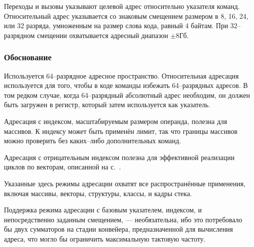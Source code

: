 \documentclass[forwardcom.tex]{subfiles}
\begin{document}
Переходы и вызовы указывают целевой адрес относительно указателя команд. Относительный адрес указывается со знаковым смещением размером в 8, 16, 24, или 32 разряда, умноженным на размер слова кода, равный 4 байтам. При 32--разрядном смещении охватывается адресный диапазон $\pm8\text{Гб}$.


\subsubsection{Обоснование}
Используется 64--разрядное адресное пространство. Относительная адресация используется для того, чтобы в коде команды избежать 64--разрядных адресов. В том редком случае, когда 64--разрядный абсолютный адрес необходим, он должен быть загружен в регистр, который затем используется как указатель.

Адресация с индексом, масштабируемым размером операнда, полезна для массивов. К индексу может быть применён лимит, так что границы массивов можно проверить без каких--либо дополнительных команд.

Адресация с отрицательным индексом полезна для эффективной реализации циклов по векторам, описанной на с.~\pageref{vectorLoops}.

Указанные здесь режимы адресации охватят все распространённые применения, включая массивы, векторы, структуры, классы, и кадры стека.

Поддержка режима адресации с базовым указателем, индексом, и непосредственно заданным смещением, --- необязательна, ибо это потребовало бы двух сумматоров на стадии конвейера, предназначенной для вычисления адреса, что могло бы ограничить максимальную тактовую частоту.
\end{document}
